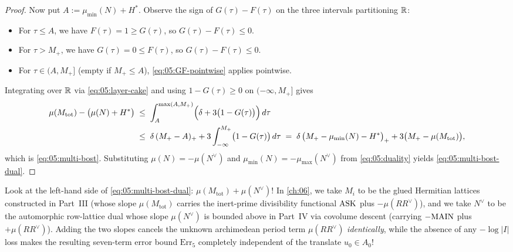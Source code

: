 \begin{proof}
Now put $A := \mu_{\min}(N) + H^*$. Observe the sign of $G(\tau) - F(\tau)$ on the three intervals partitioning $\mathbb{R}$:
\begin{itemize}
\item For $\tau \le A$, we have $F(\tau) = 1 \ge G(\tau)$, so $G(\tau) - F(\tau) \le 0$.
\item For $\tau > M_+$, we have $G(\tau) = 0 \le F(\tau)$, so $G(\tau) - F(\tau) \le 0$.
\item For $\tau \in (A, M_+]$ (empty if $M_+ \le A$), \eqref{eq:05:GF-pointwise} applies pointwise.
\end{itemize}
Integrating over $\mathbb{R}$ via \eqref{eq:05:layer-cake} and using $1 - G(\tau) \ge 0$ on $(-\infty, M_+]$ gives
\begin{align*}
  \mu(M_{\mathrm{tot}}) - \bigl(\mu(N) + H^*\bigr)
  &\;\le\; \int_{A}^{\max(A, M_+)} \Bigl(\delta + 3\bigl(1 - G(\tau)\bigr)\Bigr)\,d\tau \\
  &\;\le\; \delta\,(M_+ - A)_+ + 3\int_{-\infty}^{M_+} \bigl(1 - G(\tau)\bigr)\,d\tau
  \;=\; \delta\,\bigl(M_+ - \mu_{\min}(N) - H^*\bigr)_+ + 3\bigl(M_+ - \mu(M_{\mathrm{tot}})\bigr),
\end{align*}
which is \eqref{eq:05:multi-bost}. Substituting $\mu(N) = -\mu(N^\vee)$ and $\mu_{\min}(N) = -\mu_{\max}(N^\vee)$ from \eqref{eq:05:duality} yields \eqref{eq:05:multi-bost-dual}.
\end{proof}

\begin{remark}
Look at the left-hand side of \eqref{eq:05:multi-bost-dual}: $\mu(M_{\mathrm{tot}}) + \mu(N^\vee)$! In \cref{ch:06}, we take $M_i$ to be the glued Hermitian lattices constructed in Part~III (whose slope $\mu(M_{\mathrm{tot}})$ carries the inert-prime divisibility functional $\mathrm{ASK}$ plus $-\mu(R R^\vee)$), and we take $N^\vee$ to be the automorphic row-lattice dual whose slope $\mu(N^\vee)$ is bounded above in Part~IV via covolume descent (carrying $-\mathrm{MAIN}$ plus $+\mu(R R^\vee)$). Adding the two slopes cancels the unknown archimedean period term $\mu(R R^\vee)$ \emph{identically}, while the absence of any $-\log|I|$ loss makes the resulting seven-term error bound $\mathrm{Err}_5$ completely independent of the translate $u_0 \in A_0$!
\end{remark}
